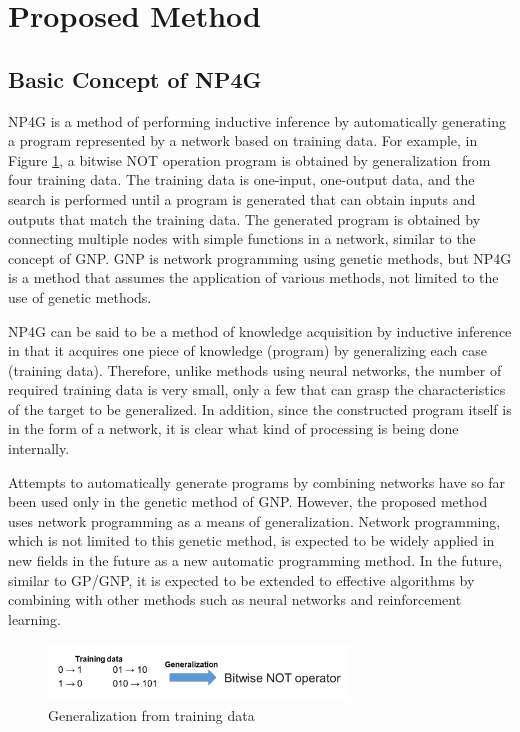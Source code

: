 \documentclass{article}
\begin{document}
\section {Proposed Method}
\subsection{Basic Concept of NP4G}
NP4G is a method of performing inductive inference by automatically generating a program represented by a network based on training data.
For example, in Figure \ref{fig:summary}, a bitwise NOT operation program is obtained by generalization from four training data.
The training data is one-input, one-output data, and the search is performed until a program is generated that can obtain inputs and outputs that match the training data.
The generated program is obtained by connecting multiple nodes with simple functions in a network, similar to the concept of GNP.
GNP is network programming using genetic methods, but NP4G is a method that assumes the application of various methods, not limited to the use of genetic methods.

NP4G can be said to be a method of knowledge acquisition by inductive inference in that it acquires one piece of knowledge (program) by generalizing each case (training data).
Therefore, unlike methods using neural networks, the number of required training data is very small, only a few that can grasp the characteristics of the target to be generalized.
In addition, since the constructed program itself is in the form of a network, it is clear what kind of processing is being done internally.

Attempts to automatically generate programs by combining networks have so far been used only in the genetic method of GNP.
However, the proposed method uses network programming as a means of generalization.
Network programming, which is not limited to this genetic method, is expected to be widely applied in new fields in the future as a new automatic programming method.
In the future, similar to GP/GNP, it is expected to be extended to effective algorithms by combining with other methods such as neural networks and reinforcement learning.

\begin{figure}[t]
\begin{center}
\includegraphics[width=80mm]{summary2.png}
\end{center}
\caption {Generalization from training data}
\label{fig:summary}
\end{figure}
\end{document}
